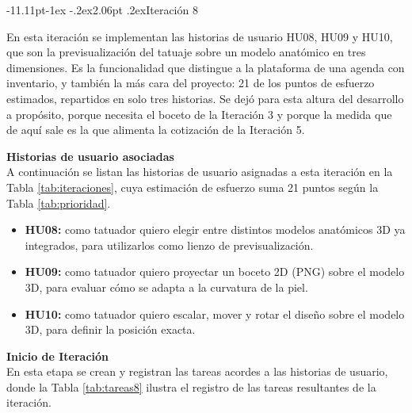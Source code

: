 \documentclass[12pt,letterpaper,oneside]{report}
\makeatletter
\renewcommand\subsection{\@startsection{subsection}{2}{\z@}%
  {-11.11pt\@plus -1ex \@minus -.2ex}{2.06pt \@plus .2ex}{\normalfont\normalsize\bfseries}}
\newcommand{\tituloparpegado}[1]{\par\textbf{#1}\\\indent\ignorespaces}
\makeatother
\begin{document}
\subsection{Iteración 8}

En esta iteración se implementan las historias de usuario HU08, HU09 y HU10, que son la previsualización del tatuaje sobre un modelo anatómico en tres dimensiones. Es la funcionalidad que distingue a la plataforma de una agenda con inventario, y también la más cara del proyecto: 21 de los puntos de esfuerzo estimados, repartidos en solo tres historias. Se dejó para esta altura del desarrollo a propósito, porque necesita el boceto de la Iteración 3 y porque la medida que de aquí sale es la que alimenta la cotización de la Iteración 5.

\vspace{0.3cm}
\tituloparpegado{Historias de usuario asociadas}
A continuación se listan las historias de usuario asignadas a esta iteración en la Tabla \ref{tab:iteraciones}, cuya estimación de esfuerzo suma 21 puntos según la Tabla \ref{tab:prioridad}.

\begin{itemize}
  \item \textbf{HU08:} como tatuador quiero elegir entre distintos modelos anatómicos 3D ya integrados, para utilizarlos como lienzo de previsualización.
  \item \textbf{HU09:} como tatuador quiero proyectar un boceto 2D (PNG) sobre el modelo 3D, para evaluar cómo se adapta a la curvatura de la piel.
  \item \textbf{HU10:} como tatuador quiero escalar, mover y rotar el diseño sobre el modelo 3D, para definir la posición exacta.
\end{itemize}

\vspace{0.3cm}
\tituloparpegado{Inicio de Iteración}
En esta etapa se crean y registran las tareas acordes a las historias de usuario, donde la Tabla \ref{tab:tareas8} ilustra el registro de las tareas resultantes de la iteración.
\end{document}

